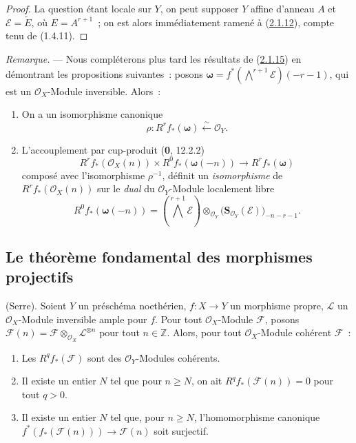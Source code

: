 \begin{proof}
La question étant locale sur $Y$, on peut supposer $Y$ affine d'anneau
$A$ et $\mathcal E=\widetilde E$, où $E=A^{r+1}$~; on est alors
immédiatement ramené à (\hyperref[III.2.1.12-fr]{2.1.12}), compte tenu de
(1.4.11).
\end{proof}

\begin{env}[2.1.16]
\label{III.2.1.16-fr}
\emph{Remarque.} --- Nous compléterons plus tard les résultats de
(\hyperref[III.2.1.15-fr]{2.1.15}) en démontrant les propositions
suivantes~: posons
$\boldsymbol\omega=f^*(\bigwedge^{r+1}\mathcal E)(-r-1)$,
qui est un $\mathcal O_X$-Module inversible. Alors~:
\begin{enumerate}
\item[{\rm(i)}] On a un isomorphisme canonique
\begin{equation}
\label{III.2.1.16.1-fr}
\tag{2.1.16.1}
\rho:R^rf_*(\boldsymbol\omega)\xleftarrow{\sim}\mathcal O_Y.
\end{equation}
\item[{\rm(ii)}] L'accouplement par cup-produit (\textbf{0}, 12.2.2)
\begin{equation}
\label{III.2.1.16.2-fr}
\tag{2.1.16.2}
R^rf_*(\mathcal O_X(n))\times R^0f_*(\boldsymbol\omega(-n))
\longrightarrow R^rf_*(\boldsymbol\omega)
\end{equation}
composé avec l'isomorphisme $\rho^{-1}$, définit un \emph{isomorphisme}
de $R^rf_*(\mathcal O_X(n))$ sur le \emph{dual} du $\mathcal O_Y$-Module
localement libre
\[
R^0f_*(\boldsymbol\omega(-n))
=\left(\bigwedge^{r+1}\mathcal E\right)
\otimes_{\mathcal O_Y}\bigl(\mathbf S_{\mathcal O_Y}(\mathcal E)\bigr)_{-n-r-1}.
\]
\end{enumerate}
\end{env}
\subsection{Le théorème fondamental des morphismes projectifs}
\label{subsection:III.2.2-fr}

\begin{theorem}[2.2.1]
\label{III.2.2.1-fr}
(Serre). Soient $Y$ un préschéma noethérien, $f:X\to Y$ un morphisme
propre, $\mathcal L$ un $\mathcal O_X$-Module inversible ample pour $f$.
Pour tout $\mathcal O_X$-Module $\mathcal F$, posons
$\mathcal F(n)=\mathcal F\otimes_{\mathcal O_X}\mathcal L^{\otimes n}$
pour tout $n\in\mathbb Z$.
Alors, pour tout $\mathcal O_X$-Module cohérent $\mathcal F$~:
\begin{enumerate}
\item[{\rm(i)}] Les $R^qf_*(\mathcal F)$ sont des
$\mathcal O_Y$-Modules cohérents.
\item[{\rm(ii)}] Il existe un entier $N$ tel que pour $n\geq N$, on ait
$R^qf_*(\mathcal F(n))=0$ pour tout $q>0$.
\item[{\rm(iii)}] Il existe un entier $N$ tel que, pour $n\geq N$,
l'homomorphisme canonique
$f^*(f_*(\mathcal F(n)))\longrightarrow\mathcal F(n)$
soit surjectif.
\end{enumerate}
\end{theorem}

